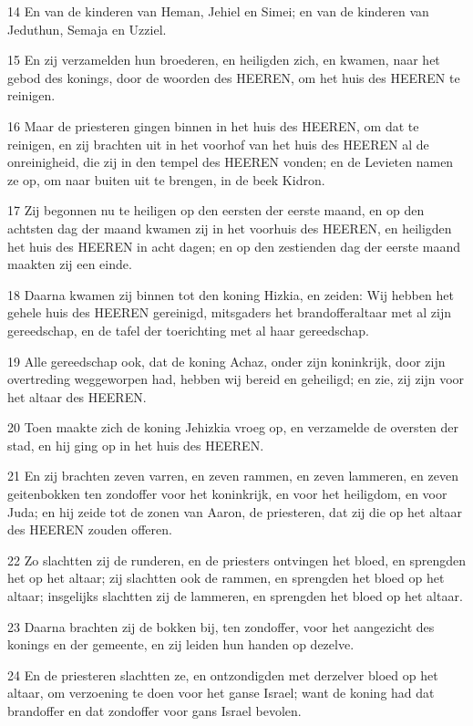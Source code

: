 \par 14 En van de kinderen van Heman, Jehiel en Simei; en van de kinderen van Jeduthun, Semaja en Uzziel.
\par 15 En zij verzamelden hun broederen, en heiligden zich, en kwamen, naar het gebod des konings, door de woorden des HEEREN, om het huis des HEEREN te reinigen.
\par 16 Maar de priesteren gingen binnen in het huis des HEEREN, om dat te reinigen, en zij brachten uit in het voorhof van het huis des HEEREN al de onreinigheid, die zij in den tempel des HEEREN vonden; en de Levieten namen ze op, om naar buiten uit te brengen, in de beek Kidron.
\par 17 Zij begonnen nu te heiligen op den eersten der eerste maand, en op den achtsten dag der maand kwamen zij in het voorhuis des HEEREN, en heiligden het huis des HEEREN in acht dagen; en op den zestienden dag der eerste maand maakten zij een einde.
\par 18 Daarna kwamen zij binnen tot den koning Hizkia, en zeiden: Wij hebben het gehele huis des HEEREN gereinigd, mitsgaders het brandofferaltaar met al zijn gereedschap, en de tafel der toerichting met al haar gereedschap.
\par 19 Alle gereedschap ook, dat de koning Achaz, onder zijn koninkrijk, door zijn overtreding weggeworpen had, hebben wij bereid en geheiligd; en zie, zij zijn voor het altaar des HEEREN.
\par 20 Toen maakte zich de koning Jehizkia vroeg op, en verzamelde de oversten der stad, en hij ging op in het huis des HEEREN.
\par 21 En zij brachten zeven varren, en zeven rammen, en zeven lammeren, en zeven geitenbokken ten zondoffer voor het koninkrijk, en voor het heiligdom, en voor Juda; en hij zeide tot de zonen van Aaron, de priesteren, dat zij die op het altaar des HEEREN zouden offeren.
\par 22 Zo slachtten zij de runderen, en de priesters ontvingen het bloed, en sprengden het op het altaar; zij slachtten ook de rammen, en sprengden het bloed op het altaar; insgelijks slachtten zij de lammeren, en sprengden het bloed op het altaar.
\par 23 Daarna brachten zij de bokken bij, ten zondoffer, voor het aangezicht des konings en der gemeente, en zij leiden hun handen op dezelve.
\par 24 En de priesteren slachtten ze, en ontzondigden met derzelver bloed op het altaar, om verzoening te doen voor het ganse Israel; want de koning had dat brandoffer en dat zondoffer voor gans Israel bevolen.
